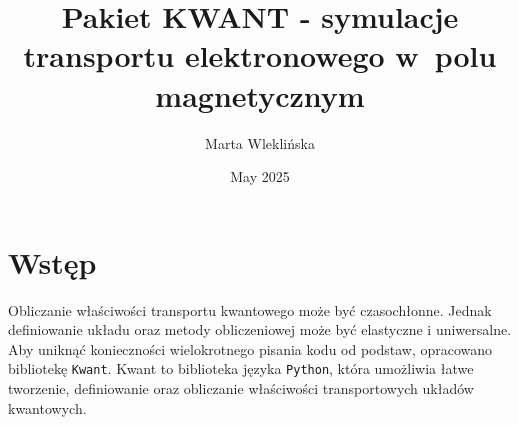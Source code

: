 \documentclass{article}
\title{Pakiet KWANT - symulacje transportu elektronowego w~polu magnetycznym}
\author{Marta Wleklińska}
\date{May 2025}
\begin{document}
\maketitle
\section{Wstęp}
Obliczanie właściwości transportu kwantowego może być czasochłonne. 
Jednak definiowanie układu oraz metody obliczeniowej może być elastyczne i uniwersalne. 
Aby uniknąć konieczności wielokrotnego pisania kodu od podstaw, opracowano bibliotekę \texttt{Kwant}. Kwant to biblioteka języka \texttt{Python}, która umożliwia łatwe tworzenie, definiowanie oraz obliczanie właściwości transportowych układów kwantowych. 

\end{document}

